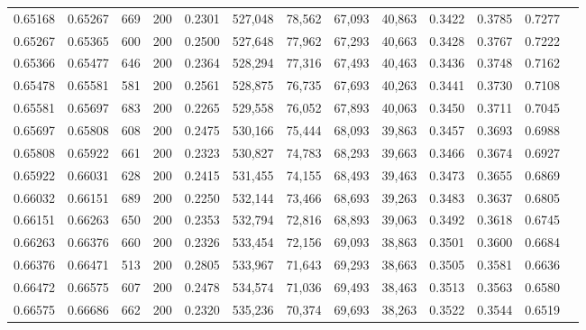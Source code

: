 \begin{tabular}{rrrrrrrrrrrrr}
0.65168 & 0.65267 &   669 & 200 &                                     0.2301 & 527,048 &  78,562 &  67,093 &  40,863 & 0.3422 & 0.3785 & 0.7277 \\
0.65267 & 0.65365 &   600 & 200 &                                     0.2500 & 527,648 &  77,962 &  67,293 &  40,663 & 0.3428 & 0.3767 & 0.7222 \\
0.65366 & 0.65477 &   646 & 200 &                                     0.2364 & 528,294 &  77,316 &  67,493 &  40,463 & 0.3436 & 0.3748 & 0.7162 \\
0.65478 & 0.65581 &   581 & 200 &                                     0.2561 & 528,875 &  76,735 &  67,693 &  40,263 & 0.3441 & 0.3730 & 0.7108 \\
0.65581 & 0.65697 &   683 & 200 &                                     0.2265 & 529,558 &  76,052 &  67,893 &  40,063 & 0.3450 & 0.3711 & 0.7045 \\
0.65697 & 0.65808 &   608 & 200 &                                     0.2475 & 530,166 &  75,444 &  68,093 &  39,863 & 0.3457 & 0.3693 & 0.6988 \\
0.65808 & 0.65922 &   661 & 200 &                                     0.2323 & 530,827 &  74,783 &  68,293 &  39,663 & 0.3466 & 0.3674 & 0.6927 \\
0.65922 & 0.66031 &   628 & 200 &                                     0.2415 & 531,455 &  74,155 &  68,493 &  39,463 & 0.3473 & 0.3655 & 0.6869 \\
0.66032 & 0.66151 &   689 & 200 &                                     0.2250 & 532,144 &  73,466 &  68,693 &  39,263 & 0.3483 & 0.3637 & 0.6805 \\
0.66151 & 0.66263 &   650 & 200 &                                     0.2353 & 532,794 &  72,816 &  68,893 &  39,063 & 0.3492 & 0.3618 & 0.6745 \\
0.66263 & 0.66376 &   660 & 200 &                                     0.2326 & 533,454 &  72,156 &  69,093 &  38,863 & 0.3501 & 0.3600 & 0.6684 \\
0.66376 & 0.66471 &   513 & 200 &                                     0.2805 & 533,967 &  71,643 &  69,293 &  38,663 & 0.3505 & 0.3581 & 0.6636 \\
0.66472 & 0.66575 &   607 & 200 &                                     0.2478 & 534,574 &  71,036 &  69,493 &  38,463 & 0.3513 & 0.3563 & 0.6580 \\
0.66575 & 0.66686 &   662 & 200 &                                     0.2320 & 535,236 &  70,374 &  69,693 &  38,263 & 0.3522 & 0.3544 & 0.6519 \\

\end{tabular}
